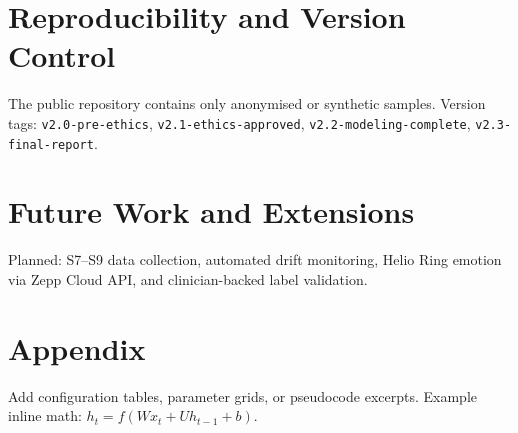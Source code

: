 \documentclass[12pt,a4paper]{article}
\begin{document}
\section{Reproducibility and Version Control}
The public repository contains only anonymised or synthetic samples. Version tags: \texttt{v2.0-pre-ethics}, \texttt{v2.1-ethics-approved}, \texttt{v2.2-modeling-complete}, \texttt{v2.3-final-report}.

\section{Future Work and Extensions}
Planned: S7--S9 data collection, automated drift monitoring, Helio Ring emotion via Zepp Cloud API, and clinician-backed label validation.

\appendix
\section{Appendix}
Add configuration tables, parameter grids, or pseudocode excerpts. Example inline math: $h_t = f(Wx_t + Uh_{t-1} + b)$.
\end{document}
